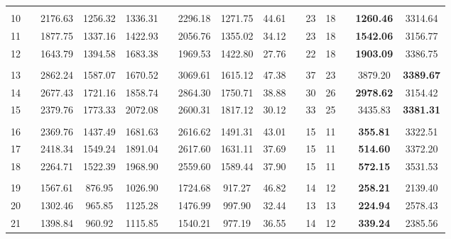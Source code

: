 \begin{table}[!t]
{\begin{tabular}{ccccccccccccccc}
      &  &  &  &  & & &  & & & & & & & \\
    10 &  & 2176.63 & 1256.32 & 1336.31 & & 2296.18 & 1271.75 & 44.61 & & 23 & 18 & & \textbf{1260.46} & 3314.64\\
    11 &  & 1877.75 & 1337.16 & 1422.93 & & 2056.76 & 1355.02 & 34.12 & & 23 & 18 & & \textbf{1542.06} & 3156.77\\
    12 &  & 1643.79 & 1394.58 & 1683.38 & & 1969.53 & 1422.80 & 27.76 & & 22 & 18 & & \textbf{1903.09} & 3386.75\\[-9pt]
      &  &  &  &  & & &  & & & & & & & \\
    13 &  & 2862.24 & 1587.07 & 1670.52 & & 3069.61 & 1615.12 &47.38& & 37 & 23 & & 3879.20          & \textbf{3389.67}\\
    14 &  & 2677.43 & 1721.16 & 1858.74 & & 2864.30 & 1750.71 & 38.88 & & 30 & 26 & & \textbf{2978.62} & 3154.42\\
    15 &  & 2379.76 & 1773.33 & 2072.08 & & 2600.31 & 1817.12 & 30.12 & & 33 & 25 & & 3435.83          & \textbf{3381.31}\\[-9pt]
      &  &  &  &  & & &  & & & & & & & \\
    16 &  & 2369.76 & 1437.49 & 1681.63 & & 2616.62 & 1491.31 & 43.01 & & 15 & 11 & & \textbf{355.81}  & 3322.51\\
    17 &  & 2418.34 & 1549.24 & 1891.04 & & 2617.60 & 1631.11 & 37.69 & & 15 & 11 & & \textbf{514.60}  & 3372.20\\
    18 &  & 2264.71 & 1522.39 & 1968.90 & & 2559.60 & 1589.44 & 37.90 & & 15 & 11 & & \textbf{572.15}  & 3531.53\\[-9pt]
      &  &  &  &  & & &  & & & & & & & \\
    19 &  & 1567.61 & 876.95  & 1026.90 & & 1724.68 & 917.27  & 46.82 & & 14 & 12 & & \textbf{258.21}  & 2139.40\\
    20 &  & 1302.46 & 965.85  & 1125.28 & & 1476.99 & 997.90  & 32.44 & & 13 & 13 & & \textbf{224.94}  & 2578.43\\
    21 &  & 1398.84 & 960.92  & 1115.85 & & 1540.21 & 977.19  & 36.55 & & 14 & 12 & & \textbf{339.24}  & 2385.56\\
    \bottomrule
    \end{tabular}
    }
    \label{tab:res_mcttrp}
\end{table}

